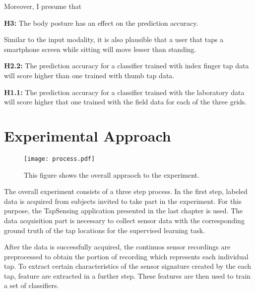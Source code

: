 Moreover, I presume that 
\begin{center}
  \begin{framed}
    \textbf{H3:} The body posture has an effect on the prediction accuracy.
  \end{framed}
\end{center}

Similar to the input modality, it is also plausible that a user that taps a smartphone screen while sitting will move lesser than standing.

\begin{center}
  \begin{framed}
    \textbf{H2.2:} The prediction accuracy for a classifier trained with index finger tap data will score higher than one trained with thumb tap data.
  \end{framed}
\end{center}


\begin{center}
  \begin{framed}
    \textbf{H1.1:} The prediction accuracy for a classifier trained with the laboratory data will score higher that one trained with the field data for each of the three grids.
  \end{framed}
\end{center}

\section{Experimental Approach}

\begin{figure}[h!]
  \centering
  \texttt{[image: process.pdf]}
  \caption{This figure shows the overall appraoch to the experiment.} \label{fig:appraoch}
\end{figure}

The overall experiment consists of a three step process. In the first step, labeled data is acquired from subjects invited to take part in the experiment. For this purpose, the TapSensing application presented in the last chapter is used. The data acquisition part is necessary to collect sensor data with the corresponding ground truth of the tap locations for the supervised learning task. 

After the data is successfully acquired, the continuos sensor recordings are preprocessed to obtain the portion of recording which represents each individual tap. To extract certain characteristics of the sensor signature created by the each tap, feature are extracted in a further step. These features are then used to train a set of classifiers. 

